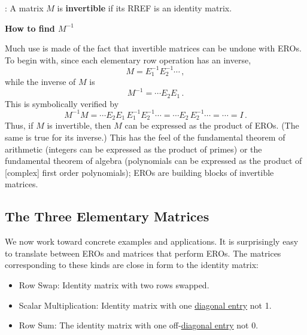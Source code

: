 : A matrix $M$ is {\bfseries invertible} if its RREF is an identity matrix.
\begin{center}
{\Large{\bfseries  How to find $M^{-1}$}}\\[5mm]
\end{center}

Much use is made of the fact that invertible matrices can be undone with EROs. 
To begin with, since each  elementary row operation has an inverse, 
\[
M= E_1^{-1} E_2^{-1} \cdots\, ,
\]
while the inverse of $M$ is 
\begin{equation*}
M^{-1}=\cdots E_2 E_1 \, .
\end{equation*}
This is symbolically verified by
\begin{equation*}
M^{-1}M=\cdots E_2 E_1\, E_1^{-1} E_2^{-1} \cdots
=\cdots E_2 \, E_2^{-1} \cdots = \cdots = I\, .
\end{equation*}
Thus, if $M$ is invertible, then  $M$  can be expressed as the product of EROs. (The same is true for its inverse.) This has the feel of the fundamental theorem of arithmetic (integers can be expressed as the product of primes) or the fundamental theorem of algebra (polynomials can be expressed as the product of [complex] first order polynomials); EROs are  building blocks of invertible matrices. 




\subsection{The Three Elementary Matrices}

We now work toward concrete examples and applications. 
It is surprisingly easy to translate between EROs and matrices that perform EROs.
The matrices corresponding to these kinds are close in form to the identity matrix:
\begin{itemize}
\item Row Swap: Identity matrix with two rows swapped.
\item Scalar Multiplication:  Identity matrix with one \hyperlink{diagmat}{diagonal entry} not 1.
\item Row Sum: The identity matrix with one off-\hyperlink{diagmat}{diagonal entry} not 0.
\end{itemize}


